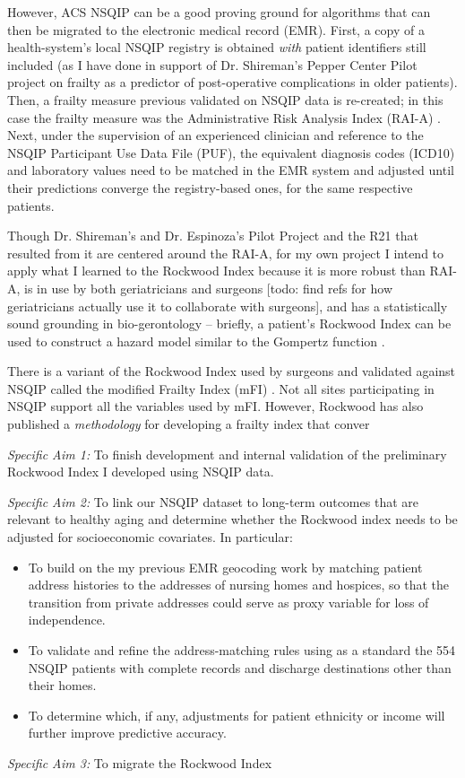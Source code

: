 However, ACS NSQIP can be a good proving ground for algorithms that can then be migrated to the electronic medical record (EMR). First, a copy of a health-system's local NSQIP registry is obtained \textit{with} patient identifiers still included (as I have done in support of Dr. Shireman's Pepper Center Pilot project on frailty as a predictor of post-operative complications in older patients). Then, a frailty measure previous validated on NSQIP data is re-created; in this case the frailty measure was the Administrative Risk Analysis Index (RAI-A) \cite{Hall_2017,Johnson_2014,Melin_2015,Gupta_2011}. Next, under the supervision of an experienced clinician and reference to the NSQIP Participant Use Data File (PUF), the equivalent diagnosis codes (ICD10) and laboratory values need to be matched in the EMR system and adjusted until their predictions converge the registry-based ones, for the same respective patients.

Though Dr. Shireman's and Dr. Espinoza's Pilot Project and the R21 that resulted from it are centered around the RAI-A, for my own project I intend to apply what I learned to the Rockwood Index because it is more robust than RAI-A, is in use by both geriatricians and surgeons [todo: find refs for how geriatricians actually use it to collaborate with surgeons], and has a statistically sound grounding in bio-gerontology -- briefly, a patient's Rockwood Index can be used to construct a hazard model  \cite{Mitnitski_2001} similar to the Gompertz function \cite{Mueller_1995,Pletcher_2000,Bokov_2017}.

There is a variant of the Rockwood Index used by surgeons and validated against NSQIP called the modified Frailty Index (mFI) \cite{Uppal_2015,Tsiouris_2013,Bellamy_2017,22491599,23711971,23949353}. Not all sites participating in NSQIP support all the variables used by mFI. However, Rockwood has also published a \textit{methodology} for developing a frailty index that conver

\emph{Specific Aim 1:} To finish development and internal validation of the preliminary Rockwood Index I developed using NSQIP data.

\emph{Specific Aim 2:} To link our NSQIP dataset to long-term outcomes that are relevant to healthy aging and determine whether the Rockwood index needs to be adjusted for socioeconomic covariates. In particular:
\begin{itemize}
\item To build on the my previous EMR geocoding work by matching patient address histories to the addresses of nursing homes and hospices, so that the transition from private addresses could serve as  proxy variable for loss of independence.
\item To validate and refine the address-matching rules using as a standard the 554 NSQIP patients with complete records and discharge destinations other than their homes.
\item To determine which, if any, adjustments for patient ethnicity or income will further improve predictive accuracy.
\end{itemize}

\emph{Specific Aim 3:} To migrate the Rockwood Index 

